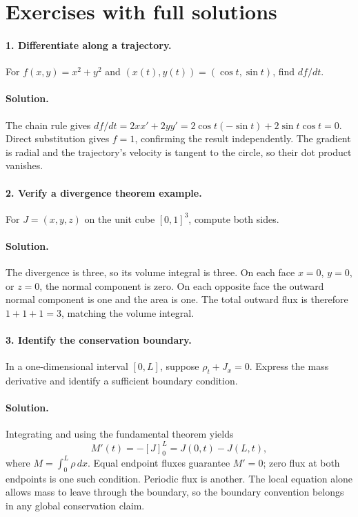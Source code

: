 \section{Exercises with full solutions}
\paragraph{1. Differentiate along a trajectory.}
For $f(x,y)=x^2+y^2$ and $(x(t),y(t))=(\cos t,\sin t)$, find $df/dt$.

\paragraph{Solution.}
The chain rule gives $df/dt=2x x'+2y y'=2\cos t(-\sin t)+
2\sin t\cos t=0$. Direct substitution gives $f=1$, confirming the
result independently. The gradient is radial and the trajectory's velocity
is tangent to the circle, so their dot product vanishes.

\paragraph{2. Verify a divergence theorem example.}
For $J=(x,y,z)$ on the unit cube $[0,1]^3$, compute both sides.

\paragraph{Solution.}
The divergence is three, so its volume integral is three. On each face
$x=0$, $y=0$, or $z=0$, the normal component is zero. On each opposite
face the outward normal component is one and the area is one. The total
outward flux is therefore $1+1+1=3$, matching the volume integral.

\paragraph{3. Identify the conservation boundary.}
In a one-dimensional interval $[0,L]$, suppose $\rho_t+J_x=0$.
Express the mass derivative and identify a sufficient boundary condition.

\paragraph{Solution.}
Integrating and using the fundamental theorem yields
\[M'(t)=-[J]_0^L=J(0,t)-J(L,t),\]
where $M=\int_0^L\rho\,dx$.
Equal endpoint fluxes guarantee $M'=0$; zero flux at both endpoints is one
such condition. Periodic flux is another. The local equation alone allows
mass to leave through the boundary, so the boundary convention belongs in
any global conservation claim.


